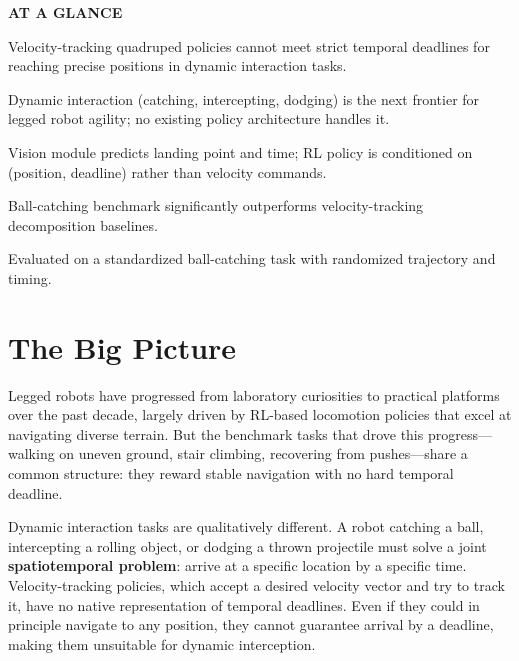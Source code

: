 \documentclass[10pt,twocolumn]{article}
\begin{document}
\begin{mdframed}[backgroundcolor=boxgray,linecolor=rulered,linewidth=1pt,
    innerleftmargin=6pt,innerrightmargin=6pt,
    innertopmargin=6pt,innerbottommargin=6pt]
\textbf{\small AT A GLANCE}\par\vspace{4pt}
\begin{description}[leftmargin=0pt,labelsep=4pt,itemsep=2pt,parsep=0pt,
    font=\small\bfseries]
  \item[Problem:] Velocity-tracking quadruped policies cannot meet strict temporal
    deadlines for reaching precise positions in dynamic interaction tasks.
  \item[Why it matters:] Dynamic interaction (catching, intercepting, dodging) is the
    next frontier for legged robot agility; no existing policy architecture handles it.
  \item[Method:] Vision module predicts landing point and time; RL policy is conditioned
    on (position, deadline) rather than velocity commands.
  \item[Result:] Ball-catching benchmark significantly outperforms velocity-tracking
    decomposition baselines.
  \item[Evidence:] Evaluated on a standardized ball-catching task with randomized
    trajectory and timing.
\end{description}
\end{mdframed}

\section{The Big Picture}

Legged robots have progressed from laboratory curiosities to practical platforms
over the past decade, largely driven by RL-based locomotion policies that excel at
navigating diverse terrain. But the benchmark tasks that drove this progress---walking
on uneven ground, stair climbing, recovering from pushes---share a common structure:
they reward stable navigation with no hard temporal deadline.

Dynamic interaction tasks are qualitatively different. A robot catching a ball,
intercepting a rolling object, or dodging a thrown projectile must solve a joint
\textbf{spatiotemporal problem}: arrive at a specific location by a specific time.
Velocity-tracking policies, which accept a desired velocity vector and try to track
it, have no native representation of temporal deadlines. Even if they could in
principle navigate to any position, they cannot guarantee arrival by a deadline,
making them unsuitable for dynamic interception.
\end{document}

